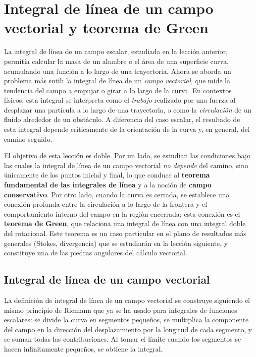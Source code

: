 \chapter{Integral de línea de un campo vectorial y teorema de Green}

La integral de línea de un campo escalar, estudiada en la lección anterior,
permitía calcular la masa de un alambre o el área de una superficie curva,
acumulando una función a lo largo de una trayectoria. Ahora se aborda un
problema más sutil: la integral de línea de un \emph{campo vectorial}, que
mide la tendencia del campo a empujar o girar a lo largo de la curva. En
contextos físicos, esta integral se interpreta como el \emph{trabajo}
realizado por una fuerza al desplazar una partícula a lo largo de una
trayectoria, o como la \emph{circulación} de un fluido alrededor de un
obstáculo. A diferencia del caso escalar, el resultado de esta integral
depende críticamente de la orientación de la curva y, en general, del
camino seguido.

El objetivo de esta lección es doble. Por un lado, se estudian las
condiciones bajo las cuales la integral de línea de un campo vectorial
\emph{no depende} del camino, sino únicamente de los puntos inicial y
final, lo que conduce al \textbf{teorema fundamental de las integrales
de línea} y a la noción de \textbf{campo conservativo}. Por otro lado,
cuando la curva es cerrada, se establece una conexión profunda entre la
circulación a lo largo de la frontera y el comportamiento interno del
campo en la región encerrada: esta conexión es el \textbf{teorema de
Green}, que relaciona una integral de línea con una integral doble del
rotacional. Este teorema es un caso particular en el plano de resultados
más generales (Stokes, divergencia) que se estudiarán en la lección
siguiente, y constituye una de las piedras angulares del cálculo
vectorial.

\section{Integral de línea de un campo vectorial}

La definición de integral de línea de un campo vectorial se construye
siguiendo el mismo principio de Riemann que ya se ha usado para
integrales de funciones escalares: se divide la curva en segmentos
pequeños, se multiplica la componente del campo en la dirección del
desplazamiento por la longitud de cada segmento, y se suman todas las
contribuciones. Al tomar el límite cuando los segmentos se hacen
infinitamente pequeños, se obtiene la integral.

